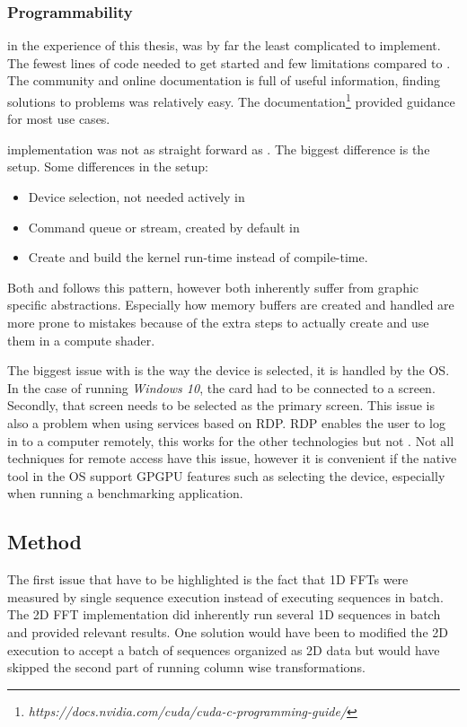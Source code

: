 \subsubsection{Programmability}

{\CU} in the experience of this thesis, was by far the least complicated to implement. The fewest lines of code needed to get started and few limitations compared to {\CPP}. The {\CU} community and online documentation is full of useful information, finding solutions to problems was relatively easy. The documentation\footnote{\textit{https://docs.nvidia.com/cuda/cuda-c-programming-guide/}} provided guidance for most use cases.

{\OCL} implementation was not as straight forward as {\CU}. The biggest difference is the setup. Some differences in the setup:
\begin{itemize}
	\item Device selection, not needed actively in {\CU}
	\item Command queue or stream, created by default in {\CU}
	\item Create and build the \gls{kernel} run-time instead of compile-time.
\end{itemize}
Both {\DX} and {\GL} follows this pattern, however both inherently suffer from graphic specific abstractions. Especially how memory buffers are created and handled are more prone to mistakes because of the extra steps to actually create and use them in a compute shader.

The biggest issue with {\GL} is the way the device is selected, it is handled by the \gls{OS}. In the case of running \emph{Windows 10}, the card had to be connected to a screen. Secondly, that screen needs to be selected as the primary screen. This issue is also a problem when using services based on \gls{RDP}. \gls{RDP} enables the user to log in to a computer remotely, this works for the other technologies but not {\GL}. Not all techniques for remote access have this issue, however it is convenient if the native tool in the \gls{OS} support \gls{GPGPU} features such as selecting the device, especially when running a benchmarking application.

\subsection{Method}

The first issue that have to be highlighted is the fact that \gls{1D} \gls{FFT}s were measured by single sequence execution instead of executing sequences in batch. The \gls{2D} \gls{FFT} implementation did inherently run several \gls{1D} sequences in batch and provided relevant results. One solution would have been to modified the \gls{2D} execution to accept a batch of sequences organized as \gls{2D} data but would have skipped the second part of running column wise transformations.

